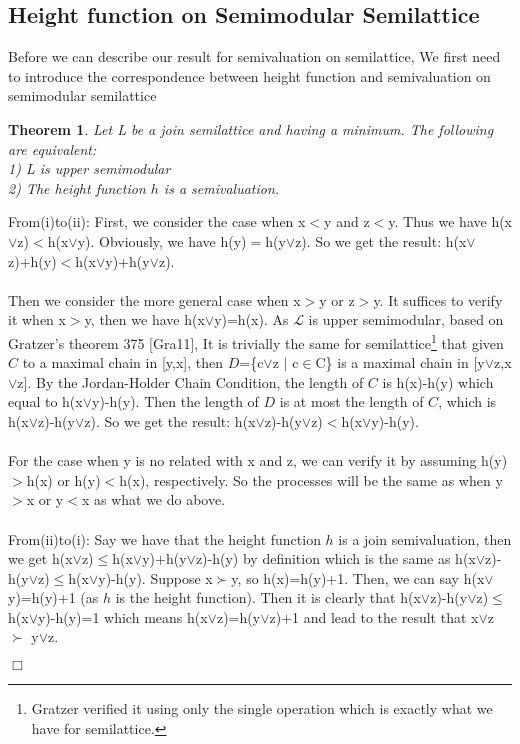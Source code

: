 \documentclass{article}
\newenvironment{proof}{\par \noindent {\bf Proof:}}{\begin{flushright}$\Box$\end{flushright}\par \noindent}
\newtheorem{theorem}{\bf Theorem}
\begin{document}
\subsection{Height function on Semimodular Semilattice}
Before we can describe our result for semivaluation on semilattice,  We first need to introduce the correspondence between height function and semivaluation on semimodular semilattice 

\begin{theorem} Let L be a join semilattice and having a minimum. The following are equivalent: \\

1) L is upper semimodular \\

2) The height function $h$ is a semivaluation. 

\end{theorem}

\begin{proof}
From(i)to(ii): First, we consider the case when x$<$y and z$<$y. Thus we have h(x$\vee$z)$<$h(x$\vee$y). Obviously, we have h(y)$=$h(y$\vee$z). So we get the result: h(x$\vee$z)+h(y)$<$h(x$\vee$y)+h(y$\vee$z).\\\\
Then we consider the more general case when x$>$y or z$>$y. It suffices to verify it when x$>$y, then we have h(x$\vee$y)=h(x). As $\mathcal{L}$ is upper semimodular, based on Gratzer's theorem 375 [Gra11], It is trivially the same for semilattice\footnote{Gratzer verified it using only the single operation which is exactly what we have for semilattice.} that given $C$ to a maximal chain in [y,x], then $D$=\{c$\vee$z $|$ c$\in$C\} is a maximal chain in [y$\vee$z,x$\vee$z]. By the Jordan-Holder Chain Condition, the length of $C$ is h(x)-h(y) which equal to h(x$\vee$y)-h(y). Then the length of $D$ is at most the length of $C$, which is h(x$\vee$z)-h(y$\vee$z). So we get the result: h(x$\vee$z)-h(y$\vee$z)$<$h(x$\vee$y)-h(y).\\\\
For the case when y is no related with x and z, we can verify it by assuming h(y)$>$h(x) or h(y)$<$h(x), respectively. So the processes will be the same as when y$>$x or y$<$x as what we do above.\\\\
From(ii)to(i): Say we have that the height function $h$ is a join semivaluation, then we get  h(x$\vee$z)$\leq$h(x$\vee$y)+h(y$\vee$z)-h(y) by definition which is the same as h(x$\vee$z)-h(y$\vee$z)$\leq$h(x$\vee$y)-h(y). Suppose x$\succ$y, so h(x)=h(y)+1. Then, we can say h(x$\vee$y)=h(y)+1 (as $h$ is the height function). Then it is clearly that h(x$\vee$z)-h(y$\vee$z)$\leq$h(x$\vee$y)-h(y)=1 which means h(x$\vee$z)=h(y$\vee$z)+1 and lead to the result that x$\vee$z $\succ$ y$\vee$z.

\end{proof} 
\end{document}
